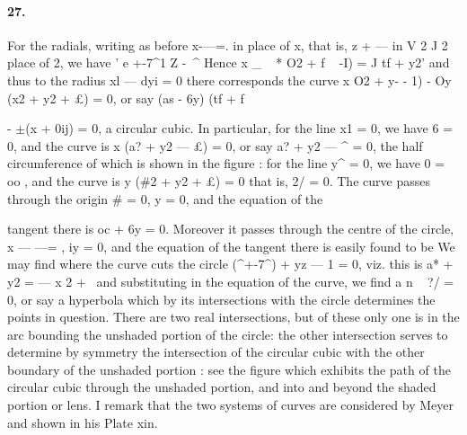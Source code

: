 \documentclass[11pt,a4paper]{book}
\begin{document}
{{{{{\paragraph{27.} For   the    radials,   writing   as    before    x-\----=.    in   place   of    x,   that    is,   z  +  ---    in
V  2  J  2
place  of  2,  we  have
'
e  +-7^1  Z  -~^
Hence
x        \_  ~  *  O2  +  f  ~  -I)
=
J      tf  +  y2'
and  thus  to  the  radius  xl  ---  dyi  =  0  there  corresponds  the  curve
x  O2  +  y-  -  1)  -  Oy  (x2  +  y2  +  £)  =  0,
or  say
(as  -  6y)  (tf  +  f}  -  $\pm$(x  +  0ij)  =  0,
a  circular  cubic.  In  particular,  for  the  line  x1  =  0,  we  have  6  =  0,  and  the  curve  is
x  (a?  +  y2  ---  £)  =  0,  or  say  a?  +  y2  ---  ^  =  0,  the  half  circumference  of  which  is  shown  in
the  figure  :  for  the  line  y^  =  0,  we  have  0  =  oo  ,  and  the  curve  is  y  (\#2  +  y2  +  £)  =  0
that  is,  2/  =  0.
The    curve    passes    through    the    origin    \#  =  0,    y  =  0,    and    the    equation    of    the


tangent    there    is    oc  +  6y  =  0.     Moreover    it    passes    through    the    centre    of    the    circle,
x  ---  ---= ,   iy  =  0,   and   the  equation   of  the   tangent   there   is   easily   found   to   be
We    may    find    where    the    curve    cuts     the    circle    (^+-7^)  +  yz  ---  1  =  0,    viz.    this    is
a*  +  y2  =  ---  x  \/2  +  \,  and  substituting  in  the  equation  of  the  curve,  we  find
a
n
~    ?/  =  0,
or  say
a  hyperbola  which  by  its  intersections  with  the  circle  determines  the  points  in
question.  There  are  two  real  intersections,  but  of  these  only  one  is  in  the  arc
bounding  the  unshaded  portion  of  the  circle:  the  other  intersection  serves  to  determine
by  symmetry  the  intersection  of  the  circular  cubic  with  the  other  boundary  of  the
unshaded  portion :  see  the  figure  which  exhibits  the  path  of  the  circular  cubic
through  the  unshaded  portion,  and  into  and  beyond  the  shaded  portion  or  lens.  I
remark  that  the  two  systems  of  curves  are  considered  by  Meyer  and  shown  in  his
Plate  xin.
}}}}
\end{document}
